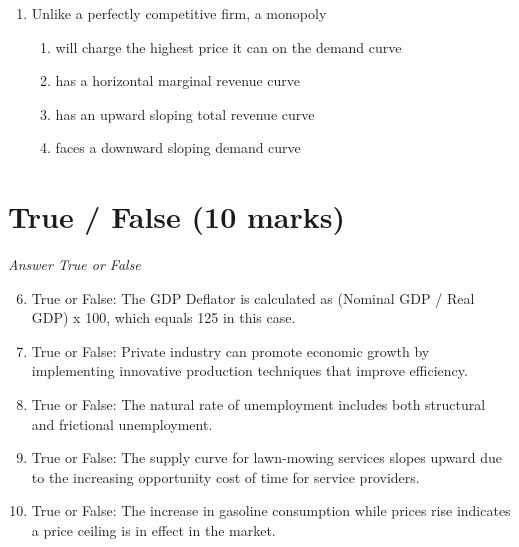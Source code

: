 \documentclass[12pt]{article}
\begin{document}
\begin{enumerate}[label=\arabic*.]
\begin{enumerate}[label=(\alph*)]
    \item The wage that is paid to the assistant manager
    \item The cost of purchasing canned goods from a wholesale food distributor
    \item The value placed on the owner's skills in an alternative career
    \item The cost of cooling the refrigerated meat display
\end{enumerate}
\item Unlike a perfectly competitive firm, a monopoly
\begin{enumerate}[label=(\alph*)]
    \item will charge the highest price it can on the demand curve
    \item has a horizontal marginal revenue curve
    \item has an upward sloping total revenue curve
    \item faces a downward sloping demand curve
\end{enumerate}
\end{enumerate}

\section*{True / False (10 marks)}
\textit{Answer True or False}
\begin{enumerate}[label=\arabic*.]
\setcounter{enumi}{5}
\item True or False: The GDP Deflator is calculated as (Nominal GDP / Real GDP) x 100, which equals 125 in this case.
\item True or False: Private industry can promote economic growth by implementing innovative production techniques that improve efficiency.
\item True or False: The natural rate of unemployment includes both structural and frictional unemployment.
\item True or False: The supply curve for lawn-mowing services slopes upward due to the increasing opportunity cost of time for service providers.
\item True or False: The increase in gasoline consumption while prices rise indicates a price ceiling is in effect in the market.
\end{enumerate}
\end{document}
